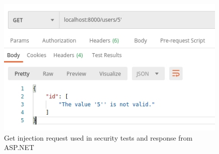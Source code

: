 \begin{figure}[H]
    \centering
    \includegraphics[width=0.7\columnwidth]{figures/pictures/getInjectionRequest.jpg}
    \caption{Get injection request used in security tests and response from ASP.NET}
    \label{fig:getInjectionRequest}
\end{figure}
